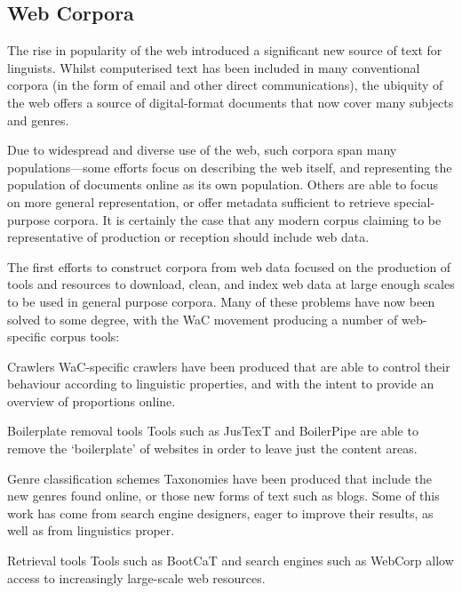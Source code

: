 
\subsection{Web Corpora}
The rise in popularity of the web introduced a significant new source of text for linguists.  Whilst computerised text has been included in many conventional corpora (in the form of email and other direct communications), the ubiquity of the web offers a source of digital-format documents that now cover many subjects and genres.

Due to widespread and diverse use of the web, such corpora span many populations---some efforts focus on describing the web itself, and representing the population of documents online as its own population.  Others are able to focus on more general representation, or offer metadata sufficient to retrieve special-purpose corpora.  It is certainly the case that any modern corpus claiming to be representative of production or reception should include web data.

The first efforts to construct corpora from web data\cite{kilgarriff2001web} focused on the production of tools and resources to download, clean, and index web data at large enough scales to be used in general purpose corpora.  Many of these problems have now been solved to some degree, with the WaC movement producing a number of web-specific corpus tools:

\begin{itemizeTitle}
    
    \item[Crawlers] WaC-specific crawlers have been produced that are able to control their behaviour according to linguistic properties\cite{schafer2014focused}, and with the intent to provide an overview of proportions online.

    \item[Boilerplate removal tools] Tools such as JusTexT\cite{pomikalek2013justext} and BoilerPipe are able to remove the `boilerplate' of websites in order to leave just the content areas.

    \item[Genre classification schemes] Taxonomies have been produced that include the new genres found online, or those new forms of text such as blogs.  Some of this work has come from search engine designers, eager to improve their results\cite{genreclassification2004}, as well as from linguistics proper\cite{sharoff2007classifying,santini10genreintro,sharoffs2015}.

    \item[Retrieval tools] Tools such as BootCaT\cite{baroni2004bootcat} and search engines such as WebCorp\cite{renouf2003webcorp} allow access to increasingly large-scale web resources.

\end{itemizeTitle}

